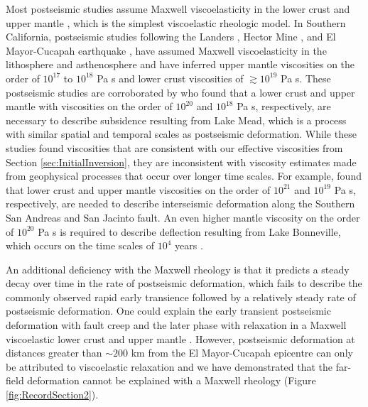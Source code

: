 \documentclass[review]{elsarticle}
\begin{document}
Most postseismic studies assume Maxwell viscoelasticity in the lower crust and upper mantle \citep[e.g.][]{Nur1974,Pollitz2000,Hetland2003,Freed2006a,Johnson2009,Hearn2009}, which is the simplest viscoelastic rheologic model.  In Southern California, postseismic studies following the Landers \citep{Pollitz2000}, Hector Mine \citep{Pollitz2001}, and El Mayor-Cucapah earthquake \citep{Spinler2015,Rollins2015}, have assumed Maxwell viscoelasticity in the lithosphere and asthenosphere and have inferred upper mantle viscosities on the order of $10^{17}$ to $10^{18}$ Pa s and lower crust viscosities of $\gtrsim 10^{19}$ Pa s.  These postseismic studies are corroborated by \citet{Kaufmann2000} who found that a lower crust and upper mantle with viscosities on the order of $10^{20}$ and $10^{18}$ Pa s, respectively, are necessary to describe subsidence resulting from Lake Mead, which is a process with similar spatial and temporal scales as postseismic deformation.  While these studies found viscosities that are consistent with our effective viscosities from Section \ref{sec:InitialInversion}, they are inconsistent with viscosity estimates made from geophysical processes that occur over longer time scales. For example, \citet{Lundgren2009} found that lower crust and upper mantle viscosities on the order of $10^{21}$ and $10^{19}$ Pa s, respectively, are needed to describe interseismic deformation along the Southern San Andreas and San Jacinto fault.  An even higher mantle viscosity on the order of $10^{20}$ Pa s is required to describe deflection resulting from Lake Bonneville, which occurs on the time scales of $10^{4}$ years \citep{Crittenden1967,Bills1987}.   

An additional deficiency with the Maxwell rheology is that it predicts a steady decay over time in the rate of postseismic deformation, which fails to describe the commonly observed rapid early transience followed by a relatively steady rate of postseismic deformation.  One could explain the early transient postseismic deformation with fault creep and the later phase with relaxation in a Maxwell viscoelastic lower crust and upper mantle \citep[e.g][]{Hearn2009,Johnson2009}. However, postseismic deformation at distances greater than $\sim200$ km from the El Mayor-Cucapah epicentre can only be attributed to viscoelastic relaxation \citep{Freed2007a} and we have demonstrated that the far-field deformation cannot be explained with a Maxwell rheology (Figure \ref{fig:RecordSection2}). 
\end{document}
